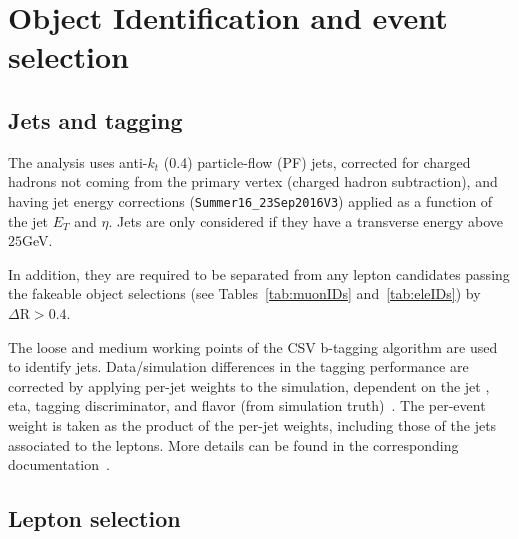 \section{Object Identification and event selection}
\label{secc:ob_id}

\subsection{Jets and \bjet tagging}
The analysis uses anti-$k_t$ (0.4) particle-flow (PF) jets, corrected for charged hadrons not coming from the primary vertex (charged hadron subtraction), and having jet energy corrections (\verb|Summer16_23Sep2016V3|) applied as a function of the jet $E_T$ and $\eta$. Jets are only considered if they have a transverse energy above $25$GeV.


In addition, they are required to be separated from any lepton candidates passing the fakeable object selections (see Tables~\ref{tab:muonIDs} and~\ref{tab:eleIDs}) by $\Delta\mathrm{R}>0.4$.

The loose and medium working points of the CSV b-tagging algorithm are used to identify \bjet jets. Data/simulation differences in the \bjet tagging performance are corrected by applying per-jet weights to the simulation, dependent on the jet \pt, eta, \bjet tagging discriminator, and flavor (from simulation truth)~\cite{btagRecommTWiki}. The per-event weight is taken as the product of the per-jet weights, including those of the jets associated to the leptons. More details can be found in the corresponding \ttH documentation~\cite{CMS_AN_2016-211,CMS_AN_2017-029}.

\subsection{Lepton selection}

